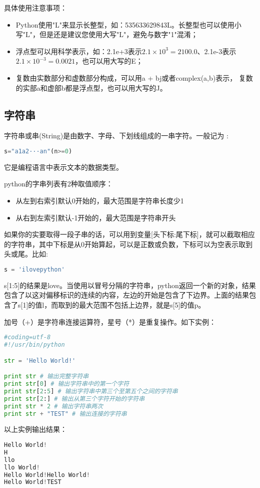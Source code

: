 具体使用注意事项：
\begin{itemize}
\item Python使用"L"来显示长整型，如：535633629843L。长整型也可以使用小写"L"，但是还是建议您使用大写"L"，避免与数字"1"混淆；

\item 浮点型可以用科学表示，如：2.1e+3表示$2.1\times 10^3=2100.0$、2.1e-3表示$2.1\times 10^{-3}=0.0021$，也可以用大写的E；

\item 复数由实数部分和虚数部分构成，可以用a + bj或者complex(a,b)表示， 复数的实部a和虚部b都是浮点型，也可以用大写的J。
\end{itemize}


\subsection{字符串}
字符串或串(String)是由数字、字母、下划线组成的一串字符。一般记为 :
\begin{lstlisting}[language=Python]
s="a1a2···an"(n>=0)
\end{lstlisting}
它是编程语言中表示文本的数据类型。

python的字串列表有2种取值顺序：
\begin{itemize}
\item 从左到右索引默认0开始的，最大范围是字符串长度少1
\item 从右到左索引默认-1开始的，最大范围是字符串开头
\end{itemize}
如果你的实要取得一段子串的话，可以用到变量[头下标:尾下标]，就可以截取相应的字符串，其中下标是从0开始算起，可以是正数或负数，下标可以为空表示取到头或尾。比如:
\begin{lstlisting}[language=Python]
s = 'ilovepython'
\end{lstlisting}
s[1:5]的结果是love。当使用以冒号分隔的字符串，python返回一个新的对象，结果包含了以这对偏移标识的连续的内容，左边的开始是包含了下边界。上面的结果包含了s[1]的值l，而取到的最大范围不包括上边界，就是s[5]的值p。

加号（+）是字符串连接运算符，星号（*）是重复操作。如下实例：
\begin{lstlisting}[language=Python]
#coding=utf-8
#!/usr/bin/python

str = 'Hello World!'

print str # 输出完整字符串
print str[0] # 输出字符串中的第一个字符
print str[2:5] # 输出字符串中第三个至第五个之间的字符串
print str[2:] # 输出从第三个字符开始的字符串
print str * 2 # 输出字符串两次
print str + "TEST" # 输出连接的字符串
\end{lstlisting}
以上实例输出结果：
\begin{lstlisting}[language=Python]
Hello World!
H
llo
llo World!
Hello World!Hello World!
Hello World!TEST
\end{lstlisting}


